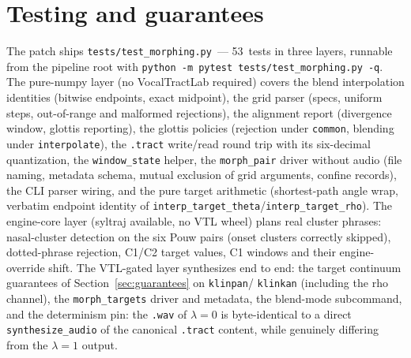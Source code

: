 \documentclass[11pt,a4paper]{article}
\newcommand{\lam}{\lambda}
\newcommand{\code}[1]{\texttt{#1}}
\newcommand{\sectref}[1]{Section~\ref{#1}}
\begin{document}
\section{Testing and guarantees}\label{sec:tests}

The patch ships \code{tests/test\_morphing.py}~--- 53~tests in three
layers, runnable from the pipeline root with
\code{python -m pytest tests/test\_morphing.py -q}.  The pure-numpy
layer (no VocalTractLab required) covers the blend interpolation
identities (bitwise endpoints, exact midpoint), the grid parser
(specs, uniform steps, out-of-range and malformed rejections), the
alignment report (divergence window, glottis reporting), the glottis
policies (rejection under \code{common}, blending under
\code{interpolate}), the \code{.tract} write/read round trip with
its six-decimal quantization, the \code{window\_state} helper, the
\code{morph\_pair} driver without audio (file naming, metadata
schema, mutual exclusion of grid arguments, confine records), the
CLI parser wiring, and the pure target arithmetic (shortest-path
angle wrap, verbatim endpoint identity of
\code{interp\_target\_theta}/\code{interp\_target\_rho}).  The
engine-core layer (syltraj available, no VTL wheel) plans real
cluster phrases: nasal-cluster detection on the six Pouw pairs
(onset clusters correctly skipped), dotted-phrase rejection,
C1/C2 target values, C1 windows and their engine-override shift.
The VTL-gated layer synthesizes end to end: the target continuum
guarantees of \sectref{sec:guarantees} on \code{klinpan}/%
\code{klinkan} (including the rho channel), the
\code{morph\_targets} driver and metadata, the blend-mode
subcommand, and the determinism pin: the \code{.wav} of $\lam=0$ is
byte-identical to a direct \code{synthesize\_audio} of the
canonical \code{.tract} content, while genuinely differing from
the $\lam=1$ output.
\end{document}
